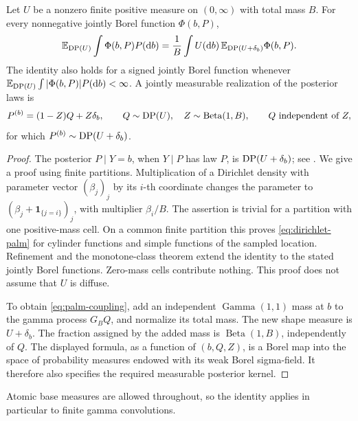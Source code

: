 \begin{lemma}
\label{lem:dirichlet-posterior}
Let \(U\) be a nonzero finite positive measure on \((0,\infty)\) with total mass \(B\).
For every nonnegative jointly Borel function \(\Phi(b,P)\),
\begin{equation}\label{eq:dirichlet-palm}
  \mathbb E_{\operatorname{DP}(U)}\int\Phi(b,P)P(\mathop{}\!\mathrm d b)
  =\frac1B\int U(\mathop{}\!\mathrm d b)\,
          \mathbb E_{\operatorname{DP}(U+\delta_b)}\Phi(b,P).
\end{equation}
The identity also holds for a signed jointly Borel function whenever \(\mathbb E_{\operatorname{DP}(U)}\int|\Phi(b,P)|P(\mathop{}\!\mathrm d b)<\infty\).
A jointly measurable realization of the posterior laws is
\begin{equation}\label{eq:palm-coupling}
  P^{(b)}=(1-Z)Q+Z\delta_b,\qquad
  Q\sim\operatorname{DP}(U),\quad Z\sim\operatorname{Beta}(1,B),
  \qquad Q\ \text{independent of }Z,
\end{equation}
for which \(P^{(b)}\sim\operatorname{DP}(U+\delta_b)\).
\end{lemma}

\begin{proof}
The posterior \(P\mid Y=b\), when \(Y\mid P\) has law \(P\), is \(\operatorname{DP}(U+\delta_b)\); see \cite[Section~2, reprint pp.~4--5, including equation~(8)]{James2005}.
We give a proof using finite partitions.
Multiplication of a Dirichlet density with parameter vector \((\beta_j)_j\) by its \(i\)-th coordinate changes the parameter to \((\beta_j+\mathbf1_{\{j=i\}})_j\), with multiplier \(\beta_i/B\).
The assertion is trivial for a partition with one positive-mass cell.
On a common finite partition this proves \eqref{eq:dirichlet-palm} for cylinder functions and simple functions of the sampled location.
Refinement and the monotone-class theorem extend the identity to the stated jointly Borel functions.
Zero-mass cells contribute nothing.
This proof does not assume that \(U\) is diffuse.

To obtain \eqref{eq:palm-coupling}, add an independent \(\operatorname{Gamma}(1,1)\) mass at \(b\) to the gamma process \(G_BQ\), and normalize its total mass.
The new shape measure is \(U+\delta_b\).
The fraction assigned by the added mass is \(\operatorname{Beta}(1,B)\), independently of \(Q\).
The displayed formula, as a function of \((b,Q,Z)\), is a Borel map into the space of probability measures endowed with its weak Borel sigma-field.
It therefore also specifies the required measurable posterior kernel.
\end{proof}

Atomic base measures are allowed throughout, so the identity applies in particular to finite gamma convolutions.

